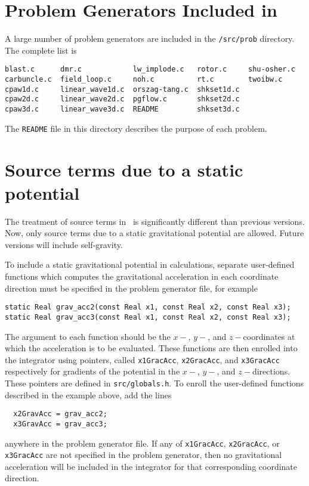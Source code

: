\section{Problem Generators Included in \ath}

A large number of problem generators are included in the {\tt /src/prob}
directory.  The complete list is
\begin{verbatim}
blast.c      dmr.c            lw_implode.c   rotor.c     shu-osher.c
carbuncle.c  field_loop.c     noh.c          rt.c        twoibw.c
cpaw1d.c     linear_wave1d.c  orszag-tang.c  shkset1d.c
cpaw2d.c     linear_wave2d.c  pgflow.c       shkset2d.c
cpaw3d.c     linear_wave3d.c  README         shkset3d.c
\end{verbatim}
The {\tt README} file in this directory describes the purpose of each
problem.

\section{Source terms due to a static potential}

The treatment of source terms in \ath\ is significantly different than
previous versions.  Now, only source terms due to a static gravitational
potential are allowed.  Future versions will include self-gravity.

To include a static gravitational potential in calculations,
separate user-defined functions which computes the gravitational acceleration
in each coordinate direction must be specified in the problem generator file,
for example
\begin{verbatim}
static Real grav_acc2(const Real x1, const Real x2, const Real x3);
static Real grav_acc3(const Real x1, const Real x2, const Real x3);
\end{verbatim}
The argument to each function should be the $x-$, $y-$, and $z-$coordinates
at which the acceleration is to be evaluated.  These functions are then enrolled
into the integrator using pointers, called {\tt x1GracAcc}, {\tt x2GracAcc},
and {\tt x3GracAcc} respectively for gradients of the potential in the
$x-$, $y-$, and $z-$directions.  These pointers are defined in
{\tt src/globals.h}.  To enroll the user-defined functions described in the
example above, add the lines
\begin{verbatim}
  x2GravAcc = grav_acc2;
  x3GravAcc = grav_acc3;
\end{verbatim}
anywhere in the problem generator file.  If any of {\tt x1GracAcc},
{\tt x2GracAcc}, or {\tt x3GracAcc} are not specified in the problem
generator, then no gravitational acceleration will be included in the
integrator for that corresponding coordinate direction.

